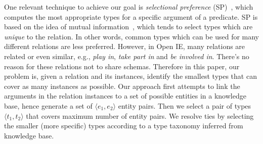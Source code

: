 
One relevant technique to achieve our goal is \textit{selectional preference}
(SP)~\cite{resnik1996selectional,erk2007simple,ritter2010latent},
which computes the most appropriate types for a specific argument of
a predicate. SP is based on the idea of mutual information~\cite{erk2007simple},
which tends to select types which are {\em unique} to the relation.
In other words, common types which can be used for many different relations
are less preferred.
However, in Open IE, many relations are related or even similar, e.g.,
{\em play in}, {\em take part in} and {\em be involved in}. There's no reason
for these relations not to share schemas. Therefore in this paper, our problem
is, given a relation and its instances, identify the smallest types that
can cover as many instances as possible.
Our approach first attempts to link the arguments in the relation instances to
a set of possible entities in a knowledge base,
hence generate a set of $ \langle e_1, e_2 \rangle$ entity pairs.
Then we select a pair of types $ \langle t_1, t_2 \rangle$ that covers maximum
number of entity pairs. We resolve ties by selecting the smaller (more
specific) types according to a type taxonomy inferred from knowledge base.


